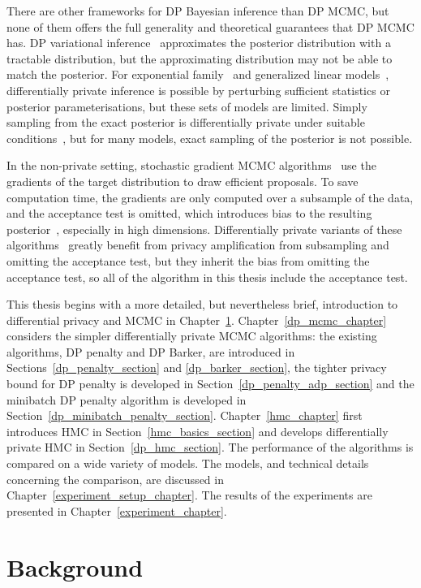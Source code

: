 \documentclass[english,twoside,openright]{HYgraduMLDS}
\begin{document}
There are other frameworks for DP Bayesian inference than DP MCMC, but none
of them offers the full generality and theoretical guarantees that DP MCMC
has. DP variational inference~\cite{JHD17} approximates the posterior
distribution with a tractable distribution, but the approximating distribution
may not be able to match the posterior. For exponential
family~\cite{BernsteinS18} and generalized linear models~\cite{KJK20},
differentially private inference is possible by perturbing sufficient statistics
or posterior parameterisations, but these sets of models are limited. Simply sampling
from the exact posterior is differentially private under suitable
conditions~\cite{DNZ17, WFS15, ZRD16}, but for many models, exact sampling of the posterior
is not possible.

In the non-private setting, stochastic gradient MCMC
algorithms~\cite{CFG14, DFB14} use the gradients of the target distribution
to draw efficient proposals. To save computation time, the gradients are
only computed over a subsample of the data, and the acceptance test is omitted,
which introduces bias to the resulting posterior~\cite{Bet15}, especially in
high dimensions.
Differentially private variants of these algorithms~\cite{WFS15, LCL19} greatly
benefit from privacy amplification from subsampling and omitting the
acceptance test,
but they inherit the bias from omitting the acceptance test, so all of the
algorithm in this thesis include the acceptance test.

This thesis begins with a more detailed, but nevertheless brief, introduction to
differential privacy and MCMC in Chapter~\ref{background_chapter}.
Chapter~\ref{dp_mcmc_chapter} considers the simpler differentially private
MCMC algorithms: the existing algorithms, DP penalty and DP Barker, are introduced
in Sections~\ref{dp_penalty_section} and \ref{dp_barker_section},
the tighter privacy bound for DP penalty is developed in
Section~\ref{dp_penalty_adp_section}
and the minibatch DP penalty algorithm is developed in
Section~\ref{dp_minibatch_penalty_section}. Chapter~\ref{hmc_chapter} first
introduces HMC in Section~\ref{hmc_basics_section} and develops differentially
private HMC in Section~\ref{dp_hmc_section}. The performance of the algorithms
is compared on a wide variety of models. The models, and technical details
concerning the comparison, are discussed in Chapter~\ref{experiment_setup_chapter}.
The results of the experiments are presented in Chapter~\ref{experiment_chapter}.

\chapter{Background}\label{background_chapter}
\end{document}

